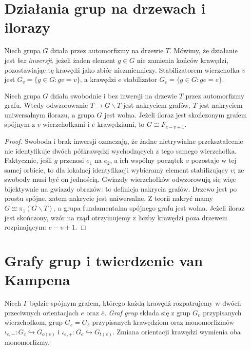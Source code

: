 \section{Działania grup na drzewach i ilorazy}
\label{sec:tg-tree-actions}

\begin{definicja}
Niech grupa $G$ działa przez automorfizmy na drzewie $T$.
Mówimy, że działanie jest \emph{bez inwersji}, jeżeli
żaden element $g\in G$ nie zamienia końców krawędzi,
pozostawiając tę krawędź jako zbiór niezmienniczy.
Stabilizatorem wierzchołka $v$ jest
$G_v=\{g\in G:gv=v\}$, a krawędzi $e$ stabilizator
$G_e=\{g\in G:ge=e\}$.
\end{definicja}

\begin{stwierdzenie}
Niech grupa $G$ działa swobodnie i bez inwersji na drzewie
$T$ przez automorfizmy grafu. Wtedy odwzorowanie
$T\to G\backslash T$ jest nakryciem grafów, $T$ jest
nakryciem uniwersalnym ilorazu, a grupa $G$ jest wolna.
Jeżeli iloraz jest skończonym grafem spójnym z $v$
wierzchołkami i $e$ krawędziami, to $G\cong F_{e-v+1}$.
\end{stwierdzenie}
\begin{proof}
Swoboda i brak inwersji oznaczają, że żadne nietrywialne
przekształcenie nie identyfikuje dwóch półkrawędzi
wychodzących z tego samego wierzchołka. Faktycznie,
jeśli $g$ przenosi $e_1$ na $e_2$, a ich wspólny początek
$v$ pozostaje w tej samej orbicie, to dla lokalnej
identyfikacji wybieramy element stabilizujący $v$;
ze swobody musi być on jednością. Gwiazdy wierzchołków
odwzorowują się więc bijektywnie na gwiazdy obrazów:
to definicja nakrycia grafów. Drzewo jest po prostu
spójne, zatem nakrycie jest uniwersalne. Z teorii
nakryć mamy $G\cong\pi_1(G\backslash T)$, a grupa
fundamentalna spójnego grafu jest wolna. Jeżeli
iloraz jest skończony, wzór na rząd otrzymujemy z
liczby krawędzi poza drzewem rozpinającym: $e-v+1$.
\end{proof}

\section{Grafy grup i twierdzenie van Kampena}
\label{sec:tg-graphs-of-groups}

\begin{definicja}
Niech $\Gamma$ będzie spójnym grafem, którego każdą
krawędź rozpatrujemy w dwóch przeciwnych orientacjach
$e$ oraz $\bar e$. \emph{Graf grup} składa się z grup
$G_v$ przypisanych wierzchołkom, grup $G_e=G_{\bar e}$
przypisanych krawędziom oraz monomorfizmów
$\iota_{e,-}:G_e\hookrightarrow G_{o(e)}$ i
$\iota_{e,+}:G_e\hookrightarrow G_{t(e)}$.
Zmiana orientacji krawędzi wymienia oba monomorfizmy.
\end{definicja}

